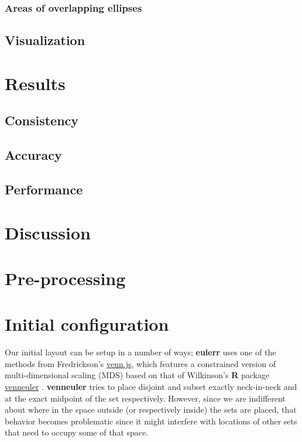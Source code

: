 \documentclass[
  headsepline=true,headings=standardclasses%
]{scrartcl}
\theoremstyle{definition}
\theoremstyle{definition}
\theoremstyle{definition}
\theoremstyle{remark}
\begin{document}
\subsubsection{Areas of overlapping
ellipses}\label{areas-of-overlapping-ellipses}

\subsection{Visualization}\label{visualization}

\section{Results}\label{results}

\subsection{Consistency}\label{consistency}

\subsection{Accuracy}\label{accuracy}

\subsection{Performance}\label{performance}

\section{Discussion}\label{discussion}

\section{Pre-processing}\label{pre-processing}

\section{Initial configuration}\label{initial-configuration-1}

Our initial layout can be setup in a number of ways; \textbf{eulerr}
uses one of the methods from Fredrickson's
\href{https://github.com/benfred/venn.js/}{venn.js}, which features a
constrained version of multi-dimensional scaling (MDS) based on that of
Wilkinson's \textbf{R} package
\href{https://CRAN.R-project.org/package=venneuler}{venneuler}
\autocite{wilkinson_2012}. \textbf{venneuler} tries to place disjoint
and subset exactly neck-in-neck and at the exact midpoint of the set
respectively. However, since we are indifferent about where in the space
outside (or respectively inside) the sets are placed, that behavior
becomes problematic since it might interfere with locations of other
sets that need to occupy some of that space.
\end{document}
